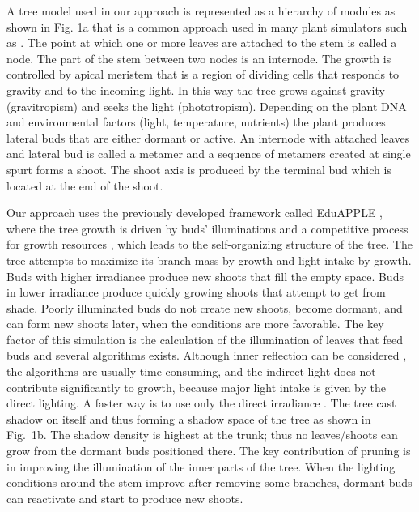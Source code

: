 \documentclass[1p]{elsarticle}
\begin{document}
A tree model used in our approach is represented as a hierarchy of
modules as shown in Fig. 1a that is a common approach used in many plant
simulators such as \cite{palubicki_self-organizing_2009,prusinkiewicz_development_1988,de_reffye_plant_1988,pirk_plastic_2012,stava_inverse_2014}. The point at which one or more
leaves are attached to the stem is called a node. The part of the stem
between two nodes is an internode. The growth is controlled by apical
meristem that is a region of dividing cells that responds to gravity and
to the incoming light. In this way the tree grows against gravity
(gravitropism) and seeks the light (phototropism). Depending on the
plant DNA and environmental factors (light, temperature, nutrients) the
plant produces lateral buds that are either dormant or active. An
internode with attached leaves and lateral bud is called a metamer and a
sequence of metamers created at single spurt forms a shoot. The shoot
axis is produced by the terminal bud which is located at the end of the
shoot.

Our approach uses the previously developed framework called EduAPPLE
\cite{kohek_eduapple:_2015}, where the tree growth is driven by buds' illuminations
\cite{mech_visual_1996,benes_efficient_1996,benes_visual_1997} and a competitive process for growth resources \cite{palubicki_self-organizing_2009,arvo_modeling_1988,alsweis_modeling_2005,runions_modeling_2007}, which leads to the self-organizing structure of the tree. The
tree attempts to maximize its branch mass by growth and light intake by
growth. Buds with higher irradiance produce new shoots that fill the
empty space. Buds in lower irradiance produce quickly growing shoots
that attempt to get from shade. Poorly illuminated buds do not create
new shoots, become dormant, and can form new shoots later, when the
conditions are more favorable. The key factor of this simulation is the
calculation of the illumination of leaves that feed buds and several
algorithms exists. Although inner reflection can be considered \cite{soler_efficient_2003},
the algorithms are usually time consuming, and the indirect light does
not contribute significantly to growth, because major light intake is
given by the direct lighting. A faster way is to use only the direct
irradiance \cite{pirk_plastic_2012,mech_visual_1996,benes_efficient_1996,benes_visual_1997}. The tree cast shadow on itself and thus
forming a shadow space of the tree as shown in Fig.~1b. The shadow
density is highest at the trunk; thus no leaves/shoots can grow from the
dormant buds positioned there. The key contribution of pruning is in
improving the illumination of the inner parts of the tree. When the
lighting conditions around the stem improve after removing some
branches, dormant buds can reactivate and start to produce new shoots.
\end{document}
